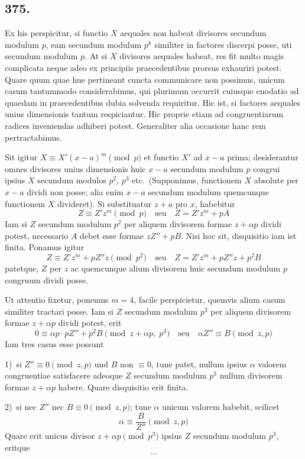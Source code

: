\documentclass[12pt,a4paper]{article}
\begin{document}
\subsection*{375.}

Ex his perspicitur, si functio $X$ aequales non habeat divisores secundum modulum $p$, eam secundum modulum $p^k$ similiter in factores discerpi posse, uti secundum modulum $p$. At si $X$ divisores aequales habeat, res fit multo magis complicata neque adeo ex principiis praecedentibus prorsus exhauriri potest. Quare quum quae hue pertineant cuncta communicare non possimus, unicum casum tantummodo considerabimus, qui plurimum occurrit cuiusque enodatio ad quaedam in praecedentibus dubia solvenda requiritur. Hic ist, si factores aequales unius dimensionis tantum respiciantur. Hic proprie etiam ad congruentiarum radices inveniendas adhiberi potest. Generaliter alia occasione hanc rem pertractabimus.

Sit igitur $X\equiv X'(x-a)^m\pmod{p}$ et functio $X'$ ad $x-a$ prima; desiderantur omnes divisores unius dimensionis huic $x-a$ secundum modulum $p$ congrui ipsius $X$ secundum modulos $p^2$, $p^3$ etc.~(Supponimus, functionem $X$ absolute per $x-a$ dividi non posse; alia enim $x-a$ secundum modulum quemcunque functionem $X$ divideret). Si substituatur $z+a$ pro $x$, habebitur
\[
Z\equiv Z'z^m\pmod{p} \quad \text{seu} \quad Z=Z'z^m+pA
\]
Iam si $Z$ secundum modulum $p^2$ per aliquem divisorem formae $z+\alpha p$ dividi potest, necessario $A$ debet esse formae $zZ''+pB$. Nisi hoc sit, disquisitio iam ist finita. Ponamus igitur
\[
Z\equiv Z'z^m+pZ''z\pmod{p^2} \quad \text{seu} \quad Z=Z'z^m+pZ''z+p^2B
\]
patetque, $Z$ per $z$ ac quemcunque alium divisorem huic secundum modulum $p$ congruum dividi posse.

Ut attentio fixetur, ponemus $m=4$, facile perspicietur, quemvis alium casum similiter tractari posse. Iam si $Z$ secundum modulum $p^3$ per aliquem divisorem formae $z+\alpha p$ dividi potest, erit
\[
0\equiv \alpha p\cdot pZ''+p^2B \pmod{z+\alpha p,\; p^3} \quad \text{seu} \quad \alpha Z''\equiv B \pmod{z,p}
\]
Iam tres casus esse possunt

1)~si $Z''\equiv 0\pmod{z,p}$ und $B$ non $\equiv 0$, tune patet, nullum ipsius $\alpha$ valorem congruentiae satisfacere adeoque $Z$ secundum modulum $p^3$ nullum divisorem formae $z+\alpha p$ habere. Quare disquisitio erit finita.

2)~si nec $Z''$ nec $B\equiv 0\pmod{z,p}$; tune $\alpha$ unicum valorem habebit, scilicet
\[
\alpha\equiv \frac{B}{Z''} \pmod{z,p}
\]
Quare erit unicus divisor $z+\alpha p\pmod{p^3}$ ipsius $Z$ secundum modulum $p^3$, eritque
\[
\ldots
\]
\end{document}
